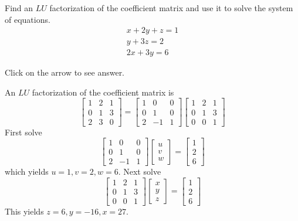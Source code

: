 \documentclass{ximera}
\begin{document}
\begin{problem}\label{prb:4.71} Find an $LU$ factorization of the coefficient matrix and use it to solve the system of equations.
\begin{equation*}
\begin{array}{c}
x+2y+z=1 \\
y+3z=2 \\
2x+3y=6
\end{array}
\end{equation*}

Click on the arrow to see answer.
\begin{expandable}{}{}
An $LU$ factorization of the coefficient matrix is
\[
\left[
\begin{array}{rrr}
1 & 2 & 1 \\
0 & 1 & 3 \\
2 & 3 & 0
\end{array}
\right] = \left[
\begin{array}{rrr}
1 & 0 & 0 \\
0 & 1 & 0 \\
2 & -1 & 1
\end{array}
\right] \left[
\begin{array}{rrr}
1 & 2 & 1 \\
0 & 1 & 3 \\
0 & 0 & 1
\end{array}
\right]
\]
First solve
\[
 \left[
\begin{array}{rrr}
1 & 0 & 0 \\
0 & 1 & 0 \\
2 & -1 & 1
\end{array}
\right] \left[
\begin{array}{c}
u \\
v \\
w
\end{array}
\right] =\left[
\begin{array}{c}
1 \\
2 \\
6
\end{array}
\right]
\]
which yields $u=1,v=2,w=6$. Next solve
\[
\left[
\begin{array}{rrr}
1 & 2 & 1 \\
0 & 1 & 3 \\
0 & 0 & 1
\end{array}
\right] \left[
\begin{array}{c}
x \\
y \\
z
\end{array}
\right] =\left[
\begin{array}{c}
1 \\
2 \\
6
\end{array}
\right]
\]
This yields $z=6,y=-16,x=27.$
\end{expandable}
\end{problem}
\end{document}
